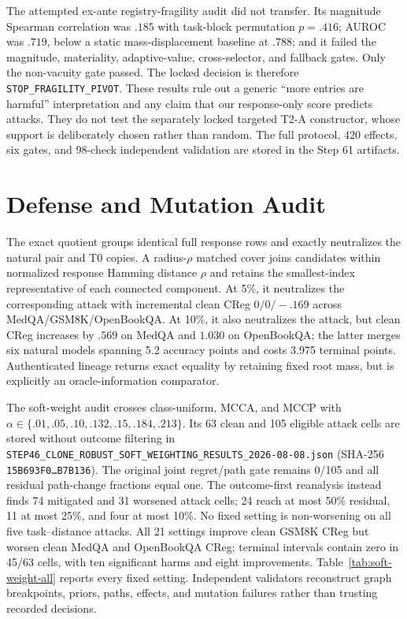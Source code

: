 The attempted ex-ante registry-fragility audit did not transfer. Its magnitude Spearman correlation was $.185$ with task-block permutation $p=.416$; AUROC was $.719$, below a static mass-displacement baseline at $.788$; and it failed the magnitude, materiality, adaptive-value, cross-selector, and fallback gates. Only the non-vacuity gate passed. The locked decision is therefore \texttt{STOP\_FRAGILITY\_PIVOT}. These results rule out a generic ``more entries are harmful'' interpretation and any claim that our response-only score predicts attacks. They do not test the separately locked targeted T2-A constructor, whose support is deliberately chosen rather than random. The full protocol, 420 effects, six gates, and 98-check independent validation are stored in the Step 61 artifacts.

\section{Defense and Mutation Audit}
\label{app:defense}





The exact quotient groups identical full response rows and exactly neutralizes the natural pair and T0 copies. A radius-$\rho$ matched cover joins candidates within normalized response Hamming distance $\rho$ and retains the smallest-index representative of each connected component. At 5\%, it neutralizes the corresponding attack with incremental clean CReg $0/0/-.169$ across MedQA/GSM8K/OpenBookQA. At 10\%, it also neutralizes the attack, but clean CReg increases by $.569$ on MedQA and $1.030$ on OpenBookQA; the latter merges six natural models spanning 5.2 accuracy points and costs 3.975 terminal points. Authenticated lineage returns exact equality by retaining fixed root mass, but is explicitly an oracle-information comparator.

The soft-weight audit crosses class-uniform, MCCA, and MCCP with $\alpha\in\{.01,.05,.10,.132,.15,.184,.213\}$. Its 63 clean and 105 eligible attack cells are stored without outcome filtering in \texttt{STEP46\_CLONE\_ROBUST\_SOFT\_WEIGHTING\_RESULTS\_2026-08-08.json} (SHA-256 \texttt{15B693F0\ldots B7B136}). The original joint regret/path gate remains 0/105 and all residual path-change fractions equal one. The outcome-first reanalysis instead finds 74 mitigated and 31 worsened attack cells; 24 reach at most 50\% residual, 11 at most 25\%, and four at most 10\%. No fixed setting is non-worsening on all five task--distance attacks. All 21 settings improve clean GSM8K CReg but worsen clean MedQA and OpenBookQA CReg; terminal intervals contain zero in 45/63 cells, with ten significant harms and eight improvements. Table~\ref{tab:soft-weight-all} reports every fixed setting. Independent validators reconstruct graph breakpoints, priors, paths, effects, and mutation failures rather than trusting recorded decisions.

